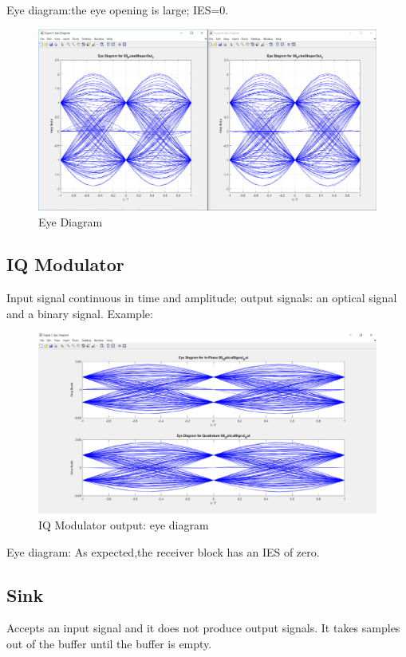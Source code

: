 Eye diagram:the eye opening is large; IES=0.
\begin{figure}[h]
	\centering
	\includegraphics[width=1\textwidth]{../lib/m_qam_transmitter/figures/S5_S6_eye.pdf}
	\caption{Eye Diagram}\label{fig:eye}
\end{figure}

\subsection*{IQ Modulator}
Input signal continuous in time and amplitude; output signals: an optical signal and a binary signal.
Example:
\begin{figure}[h]
	\centering
	\includegraphics[width=1\textwidth]{../lib/m_qam_transmitter/figures/S8_eye.pdf}
	\caption{IQ Modulator output: eye diagram}\label{fig:IQ Modulator output: eye diagram}
\end{figure}

Eye diagram: As expected,the receiver block has an IES of zero.

\subsection*{Sink}
Accepts an input signal and it does not produce output signals. It takes
samples out of the buffer until the buffer is empty.




